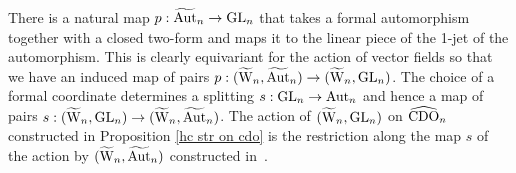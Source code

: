 There is a natural map $p : \widetilde{{\rm Aut}}_n \to {\rm GL}_n$ that takes a formal automorphism together with a closed two-form and
maps it to the linear piece of the 1-jet of the automorphism. This is
clearly equivariant for the action of vector fields so that we have an
induced map of pairs $p : (\widetilde{{{\rm W}}}_n, \widetilde{\rm Aut}_n) \to (\widetilde{{{\rm W}}}_n, {\rm GL}_n)$. 
The choice of a formal coordinate determines a splitting $s : {\rm GL}_n \to {\rm Aut}_n$ and hence a map of pairs 
$s : (\widetilde{{{\rm W}}}_n, {\rm GL}_n)\to (\widetilde{{{\rm W}}}_n, \widetilde{\rm Aut}_n)$.
The action of $(\widetilde{{{\rm W}}}_n, {\rm GL}_n)$ on $\widehat{\rm CDO}_n$ constructed in
Proposition \ref{hc str on cdo} is the restriction along the map $s$ of the action by
$(\widetilde{{{\rm W}}}_n, \widetilde{\rm Aut}_n)$ constructed in~\cite{GMS}. 







